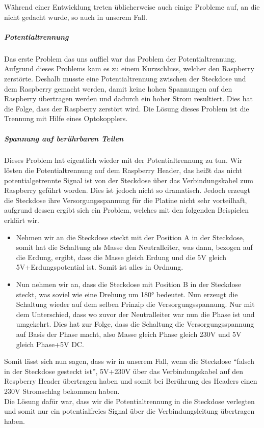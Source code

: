 Während einer Entwicklung treten üblicherweise auch einige Probleme auf, an die nicht gedacht wurde, so auch in unserem Fall.\\
\subparagraph{Potentialtrennung}\label{sec:report_hardware_pot}
Das erste Problem das uns auffiel war das Problem der Potentialtrennung. Aufgrund dieses Problems kam es zu einem Kurzschluss, welcher den Raspberry zerstörte. Deshalb musste eine Potentialtrennung zwischen der Steckdose und dem Raspberry gemacht werden, damit keine hohen Spannungen auf den Raspberry übertragen werden und dadurch ein hoher Strom resultiert. Dies hat die Folge, dass der Raspberry zerstört wird. Die Lösung dieses Problem ist die Trennung mit Hilfe eines Optokopplers.\\
\subparagraph{Spannung auf berührbaren Teilen}\label{sec:report_hardware_spannung}
Dieses Problem hat eigentlich wieder mit der Potentialtrennung zu tun. Wir lösten die Potentialtrennung auf dem Raspberry Header, das heißt das nicht potentialgetrennte Signal ist von der Steckdose über das Verbindungskabel zum Raspberry geführt worden. Dies ist jedoch nicht so dramatisch. Jedoch  erzeugt die Steckdose ihre Versorgungsspannung für die Platine nicht sehr vorteilhaft, aufgrund dessen ergibt sich ein Problem, welches mit den folgenden Beispielen erklärt wir.\\
\begin{itemize}
	\item Nehmen wir an die Steckdose steckt mit der Position A in der Steckdose, somit hat die Schaltung als Masse den Neutralleiter, was dann, bezogen auf die Erdung, ergibt, dass die Masse gleich Erdung und die  5V gleich 5V+Erdungspotential ist. Somit ist alles in Ordnung.
	\item Nun nehmen wir an, dass die Steckdose mit Position B in der Steckdose steckt, was soviel wie eine Drehung um 180° bedeutet. Nun erzeugt die Schaltung wieder auf dem selben Prinzip die Versorgungsspannung. Nur mit dem Unterschied, dass wo zuvor der Neutralleiter war nun die Phase ist und umgekehrt. Dies hat zur Folge, dass die Schaltung die Versorgungsspannung auf Basis der Phase macht, also Masse gleich Phase gleich 230V und 5V gleich Phase+5V DC.
\end{itemize}
Somit lässt sich nun sagen, dass wir in unserem Fall, wenn die Steckdose \enquote{falsch in der Steckdose gesteckt ist}, 5V+230V über das Verbindungskabel auf den Respberry Header übertragen haben und somit bei Berührung des Headers einen 230V Stromschlag bekommen haben.\\
Die Lösung dafür war, dass wir die Potentialtrennung in die Steckdose verlegten und somit nur ein potentialfreies Signal über die Verbindungsleitung übertragen haben.